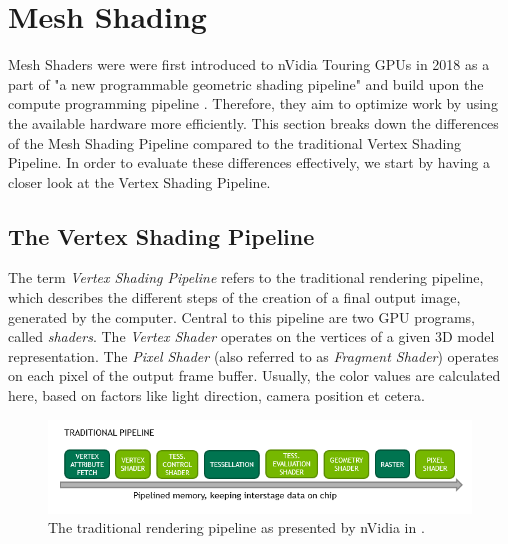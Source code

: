 \chapter{Mesh Shading} \label{cpt-mesh-shading}


Mesh Shaders were were first introduced to nVidia Touring \ac{GPU}s in 2018 as a part of
"a new programmable geometric shading pipeline" and build upon the compute programming 
pipeline \cite[Christoph Kubisch]{Kubisch2018}. Therefore, they aim to optimize work by 
using the available hardware more efficiently. This section breaks down the differences 
of the Mesh Shading Pipeline compared to the traditional Vertex Shading Pipeline. In order 
to evaluate these differences effectively, we start by having a closer look at the 
Vertex Shading Pipeline.

\section{The Vertex Shading Pipeline} \label{sec-vertex-shading-pipeline}

The term \emph{Vertex Shading Pipeline} refers to the traditional rendering pipeline, which 
describes the different steps of the creation of a final output image, generated by the 
computer. Central to this pipeline are two \ac{GPU} programs, called \emph{shaders}. The 
\emph{Vertex Shader} operates on the vertices of a given 3D model representation. 
The \emph{Pixel Shader} (also referred to as \emph{Fragment Shader}) operates on each pixel 
of the output frame buffer. Usually, the color values are calculated here, based on factors 
like light direction, camera position et cetera. \\

\begin{figure}[h]
    \centering
    \includegraphics[width=\linewidth]{images/graphics/traditional-rendering-pipeline.png}
    \caption{The traditional rendering pipeline as presented by nVidia in \cite[Christoph Kubisch]{Kubisch2018}.}
    \label{fig:traditional-rendering-pipeline}
\end{figure}

